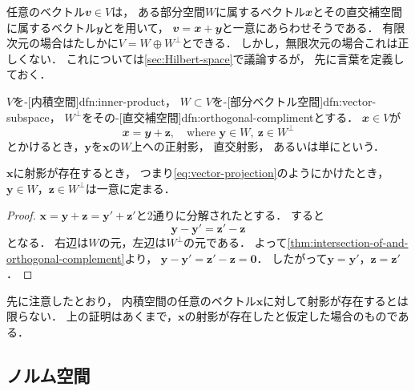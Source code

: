 \documentclass[../sotsu.tex]{subfiles}
\begin{document}
任意のベクトル$𝒗 \in V$は，
ある部分空間$W$に属するベクトル$𝒙$とその直交補空間に属するベクトル$𝒚$とを用いて，
$𝒗 = 𝒙 + 𝒚$と一意にあらわせそうである．
有限次元の場合はたしかに$V = W \oplus W^\perp$とできる．
しかし，無限次元の場合これは正しくない．
これについては\cref{sec:Hilbert-space}で議論するが，
先に言葉を定義しておく．

\begin{definition}
    \label{dfn:vector-projection}
    $V$を-[内積空間]{dfn:inner-product}，
    $W \subset V$を-[部分ベクトル空間]{dfn:vector-subspace}，
    $W^\perp$をその-[直交補空間]{dfn:orthogonal-compliment}とする．
    $𝒙 \in V$が
    \begin{equation}
        \label{eq:vector-projection}
        𝒙 = 𝒚 + \symbf{z}, 
        \quad 
        \text{where }
        \symbf{y} \in W, 
        \ 
        \symbf{z} \in W^\perp
    \end{equation}
    とかけるとき，$\symbf{y}$を$\symbf{x}$の$W$上への正射影，
    直交射影，
    あるいは単にという．
\end{definition}

\begin{lemma}
    \label{thm:proposition-is-unique}
    $\symbf{x}$に射影が存在するとき，
    つまり\cref{eq:vector-projection}のようにかけたとき，
    $\symbf{y} \in W$，$\symbf{z} \in W^\perp$は一意に定まる．
\end{lemma}

\begin{proof}
    $\symbf{x} = \symbf{y} + \symbf{z} = \symbf{y}' + \symbf{z}'$と2通りに分解されたとする．
    すると
    \begin{equation*}
        \symbf{y} - \symbf{y}' = \symbf{z}' - \symbf{z}
    \end{equation*}
    となる．
    右辺は$W$の元，左辺は$W^\perp$の元である．
    よって\cref{thm:intersection-of-and-orthogonal-complement}より，
    $\symbf{y} - \symbf{y}' = \symbf{z}' - \symbf{z} = \symbf{0}$．
    したがって$\symbf{y} = \symbf{y}'$，$\symbf{z} = \symbf{z}'$．
\end{proof}

先に注意したとおり，
内積空間の任意のベクトル$\symbf{x}$に対して射影が存在するとは限らない．
上の証明はあくまで，$\symbf{x}$の射影が存在したと仮定した場合のものである．




\subsection{ノルム空間}
\label{sec:norm-space}
\end{document}
